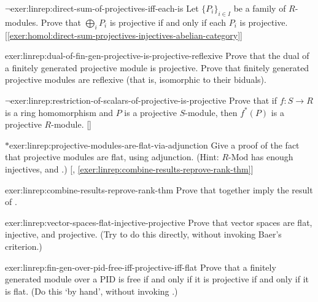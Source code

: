\begin{exer}{$\lnot$}{exer:linrep:direct-sum-of-projectives-iff-each-is}
  Let $\{P_i\}_{i \in I}$ be a family of $R$-modules. Prove that
  $\bigoplus_i P_i$ is projective if and only if each $P_i$ is
  projective. [\ref{exer:homol:direct-sum-projectives-injectives-abelian-category}]
\end{exer}

\begin{exer}{}{exer:linrep:dual-of-fin-gen-projective-is-projective-reflexive}
  Prove that the dual of a finitely generated projective module is
  projective. Prove that finitely generated projective modules are
  reflexive (that is, isomorphic to their biduals).
\end{exer}

\begin{exer}{$\lnot$}{exer:linrep:restriction-of-scalars-of-projective-is-projective}
  Prove that if $f : S \to R$ is a ring homomorphism and $P$ is a
  projective $S$-module, then $f^*(P)$ is a projective
  $R$-module. []
\end{exer}

\begin{exer}{$*$}{exer:linrep:projective-modules-are-flat-via-adjunction}
  Give a proof of the fact that projective modules are flat, using
  adjunction. (Hint: $R\text{-Mod}$ has enough injectives, and
  .)
  [,
  \ref{exer:linrep:combine-results-reprove-rank-thm}]
\end{exer}

\begin{exer}{}{exer:linrep:combine-results-reprove-rank-thm}
  Prove that
  together imply the result of
  .
\end{exer}

\begin{exer}{}{exer:linrep:vector-spaces-flat-injective-projective}
  Prove that vector spaces are flat, injective, and projective. (Try
  to do this directly, without invoking Baer's criterion.)
\end{exer}

\begin{exer}{}{exer:linrep:fin-gen-over-pid-free-iff-projective-iff-flat}
  Prove that a finitely generated module over a PID is free if and
  only if it is projective if and only if it is flat. (Do this `by
  hand', without invoking
  .)
\end{exer}

